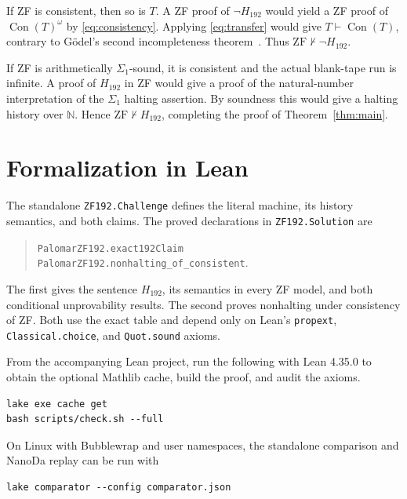 \documentclass[11pt,letterpaper]{article}
\newcommand{\ZF}{\mathrm{ZF}}
\newcommand{\N}{\mathbb{N}}
\newcommand{\Con}{\operatorname{Con}}
\newcommand{\file}[1]{\nolinkurl{#1}}
\newcommand{\Halt}{H_{192}}
\begin{document}
If ZF is consistent, then so is $T$. A ZF proof of $\neg\Halt$
would yield a ZF proof of $\Con(T)^\omega$ by
\eqref{eq:consistency}. Applying \eqref{eq:transfer} would give
$T\vdash\Con(T)$, contrary to G\"odel's second incompleteness
theorem~\cite{godel}. Thus $\ZF\nvdash\neg\Halt$.

If ZF is arithmetically $\Sigma_1$-sound, it is consistent and the
actual blank-tape run is infinite. A proof of $\Halt$ in ZF would
give a proof of the natural-number interpretation of the $\Sigma_1$
halting assertion. By soundness this would give a halting history
over $\N$. Hence $\ZF\nvdash\Halt$, completing the proof
of Theorem~\ref{thm:main}.

\section{Formalization in Lean}\label{sec:reproduction}

The standalone \texttt{ZF192.Challenge} defines the literal machine,
its history semantics, and both claims. The proved declarations in
\texttt{ZF192.Solution} are
\begin{quote}\small
\file{PalomarZF192.exact192Claim}\\
\file{PalomarZF192.nonhalting_of_consistent}.
\end{quote}
The first gives the sentence $\Halt$, its semantics in every ZF model,
and both conditional unprovability results. The second proves nonhalting
under consistency of ZF. Both use the exact table and depend only on
Lean's \file{propext}, \file{Classical.choice}, and \file{Quot.sound} axioms.

From the accompanying Lean project, run the following with Lean 4.35.0
to obtain the optional Mathlib cache, build the proof, and audit the axioms.
\begin{verbatim}
lake exe cache get
bash scripts/check.sh --full
\end{verbatim}
On Linux with Bubblewrap and user namespaces, the standalone
comparison and NanoDa replay can be run with
\begin{verbatim}
lake comparator --config comparator.json
\end{verbatim}
\end{document}
